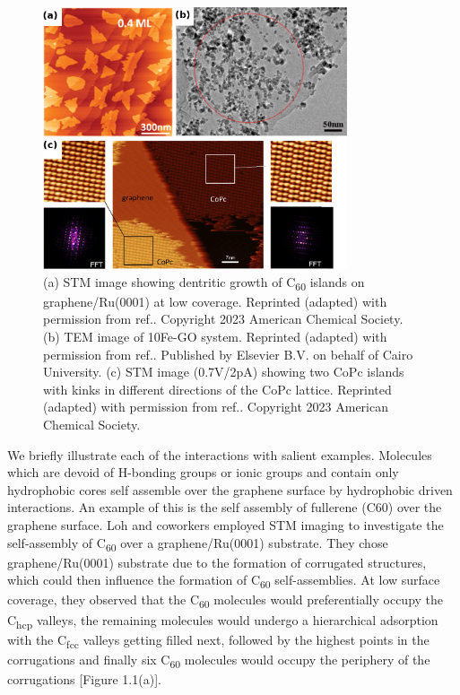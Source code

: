 \begin{figure}[h]
    \centering
    \includegraphics[width=0.8\textwidth]{Introduction/Figures/Untitled_new.png}
    \caption[Representative images depicting various types of self-assemblies formed over a graphene surface]{(a) STM image showing dentritic growth of C\textsubscript{60} islands on graphene/Ru(0001) at low coverage. Reprinted (adapted) with permission from ref.\supercite{lu_using_2012}. Copyright 2023 American Chemical Society. (b) TEM image of 10Fe-GO system. Reprinted (adapted) with permission from ref.\supercite{yang_electrostatic_2020}. Published by Elsevier B.V. on behalf of Cairo University. (c) STM image (0.7V/2pA) showing two CoPc islands with kinks in different directions of the CoPc lattice. Reprinted (adapted) with permission from ref.\supercite{hamalainen_self-assembly_2012}. Copyright 2023 American Chemical Society.}
    \label{fig:figure1}
\end{figure}

We briefly illustrate each of the interactions with salient examples. Molecules which are devoid of H-bonding groups or ionic groups and contain only hydrophobic cores self assemble over the graphene surface by hydrophobic driven interactions. An example of this is the self assembly of fullerene (C60) over the graphene surface. Loh and coworkers employed STM imaging to investigate the self-assembly of C\textsubscript{60} over a graphene/Ru(0001) substrate.\supercite{lu_using_2012} They chose graphene/Ru(0001) substrate due to the formation of corrugated structures, which could then influence the formation of C\textsubscript{60} self-assemblies. At low surface coverage, they observed that the C\textsubscript{60} molecules would preferentially occupy the C\textsubscript{hcp} valleys, the remaining molecules would undergo a hierarchical adsorption with the C\textsubscript{fcc} valleys getting filled next, followed by the highest points in the corrugations and finally six C\textsubscript{60} molecules would occupy the periphery of the corrugations [Figure 1.1(a)]. 

